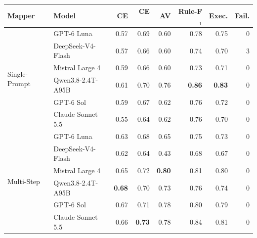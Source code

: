 \begin{tabular}{llrrrrrr}
\toprule
\textbf{Mapper} & \textbf{Model} & CE & CE$_{\equiv}$ & AV & Rule-F$_1$ & Exec. & Fail. \\
\midrule
\multirow{6}{*}{Single-Prompt} & GPT-6 Luna & 0.57 & 0.69 & 0.60 & 0.78 & 0.75 & 0 \\
 & DeepSeek-V4-Flash & 0.57 & 0.66 & 0.60 & 0.74 & 0.70 & 3 \\
 & Mistral Large 4 & 0.59 & 0.66 & 0.60 & 0.73 & 0.71 & 0 \\
 & Qwen3.8-2.4T-A95B & 0.61 & 0.70 & 0.76 & \textbf{0.86} & \textbf{0.83} & 0 \\
 & GPT-6 Sol & 0.59 & 0.67 & 0.62 & 0.76 & 0.72 & 0 \\
 & Claude Sonnet 5.5 & 0.55 & 0.64 & 0.62 & 0.76 & 0.70 & 0 \\
\midrule
\multirow{6}{*}{Multi-Step} & GPT-6 Luna & 0.63 & 0.68 & 0.65 & 0.75 & 0.73 & 0 \\
 & DeepSeek-V4-Flash & 0.62 & 0.64 & 0.43 & 0.68 & 0.67 & 0 \\
 & Mistral Large 4 & 0.65 & 0.72 & \textbf{0.80} & 0.81 & 0.80 & 0 \\
 & Qwen3.8-2.4T-A95B & \textbf{0.68} & 0.70 & 0.73 & 0.76 & 0.74 & 0 \\
 & GPT-6 Sol & 0.67 & 0.71 & 0.78 & 0.80 & 0.79 & 0 \\
 & Claude Sonnet 5.5 & 0.66 & \textbf{0.73} & 0.78 & 0.84 & 0.81 & 0 \\
\bottomrule
\end{tabular}
